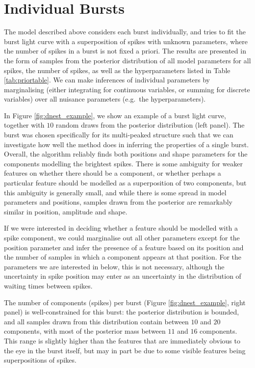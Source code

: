 \documentclass[12pt]{emulateapj}
\begin{document}
\section{Individual Bursts}
\label{ch6:oneburst}

The model described above considers each burst individually, and tries to fit the burst light curve with a superposition of spikes with unknown parameters, where the number of
spikes in a burst is not fixed a priori. The results are presented in the form of samples from the posterior distribution of all model parameters for all spikes, the number of spikes,
as well as the hyperparameters listed in Table \ref{tab:priortable}. We can make inferences of individual parameters by marginalising (either integrating for continuous variables, or summing for
discrete variables) over all nuisance parameters (e.g.\ the hyperparameters). 

In Figure \ref{fig:dnest_example}, we show an example of a burst light curve, together with $10$ random draws from the posterior distribution (left panel).
The burst was chosen specifically for its multi-peaked structure such that we can investigate how well the method does in inferring the properties 
of a single burst. Overall, the algorithm reliably finds both positions and shape parameters for the components modelling
the brightest spikes. There is some ambiguity for weaker features on whether there should be a component, or whether perhaps a
particular feature should be modelled as a superposition of two components, but this ambiguity is generally small, and while there is some
spread in model parameters and positions, samples drawn from the posterior are remarkably similar in position, amplitude and shape. 

If we were interested in deciding whether a feature should be modelled with a spike component, we could marginalise out all other parameters
except for the position parameter and infer the presence of a feature based on its position and the number of samples in which a component appears at
that position. For the parameters we are interested in below, this is not necessary, although the uncertainty in spike position may enter as an 
uncertainty in the distribution of waiting times between spikes.

The number of components (spikes) per burst (Figure \ref{fig:dnest_example}, right panel) is well-constrained for this burst: the posterior distribution is bounded, and all samples drawn
from this distribution contain between $10$ and $20$ components, with most of the posterior mass between $11$ and $16$ components. This range is slightly higher than the features that are immediately obvious to the eye 
in the burst itself, but may in part be due to some visible features being superpositions of spikes. 
\end{document}
